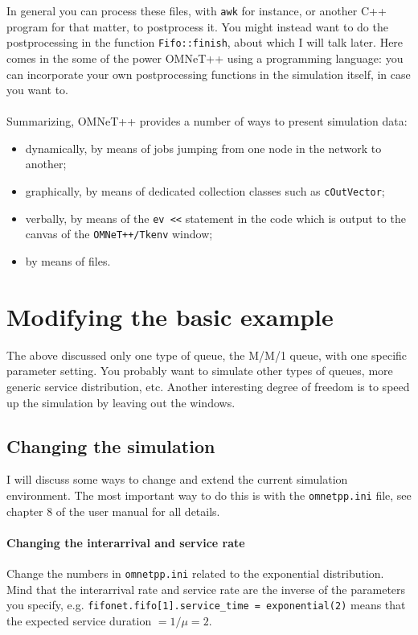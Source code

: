 \documentclass[a4paper]{article}
\begin{document}
In general you can process these files, with \texttt{awk} for instance,
or another C++ program for that matter, to postprocess it. You might
instead want to do the postprocessing  in the function
\texttt{Fifo::finish}, about which I will talk later. Here comes in
the some of the power    OMNeT++ using  a programming language:
you can incorporate your own postprocessing functions in the
simulation itself, in case you want to.

\paragraph{}
Summarizing, OMNeT++ provides a number of ways to present simulation
data:
\begin{itemize}
\item dynamically, by means of jobs jumping from one node in the
  network to another;
\item graphically, by means of dedicated collection classes such as
  \texttt{cOutVector};
\item verbally, by means of the \texttt{ev <<} statement in the code
  which is output to the  canvas of the \texttt{OMNeT++/Tkenv} window;
\item by means of files. 
\end{itemize}

\section{Modifying the basic example}
\label{sec:next-steps}
The above discussed only one type of queue, the M/M/1 queue, with one
specific parameter setting. You
probably want to simulate other types of queues, more generic service
distribution, etc. Another interesting degree of freedom is to speed
up the simulation by leaving out the windows.

\subsection{Changing the  simulation}
\label{sec:changing-basic-mm1}
I will discuss some ways to change and extend the current simulation
environment. The most important way to do this is with the
\texttt{omnetpp.ini} file, see chapter 8 of the user manual for all details.


\paragraph{Changing the interarrival and service rate}
\label{sec:chang-inter-serv}
Change the numbers in \texttt{omnetpp.ini} related to the exponential
distribution. Mind that the interarrival rate and service rate are the
inverse of the parameters you specify, e.g.
\texttt{fifonet.fifo[1].service\_time = exponential(2)} means that the
expected service duration $ = 1/\mu = 2$.
\end{document}
